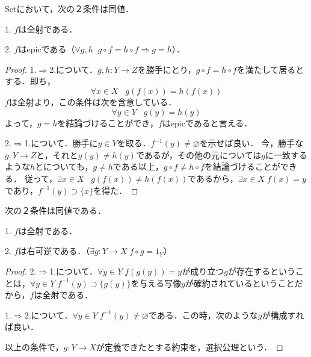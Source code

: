 \documentclass[uplatex, dvipdfmx]{jsarticle}
\begin{document}
\begin{proposition*}
    Setにおいて，次の２条件は同値．
    \begin{center}
    \end{center}

    1. $f$は全射である．

    2. $f$はepicである（$\forall g,h\;\; g\circ f=h\circ f \Rightarrow g=h$）．
\end{proposition*}
\begin{proof}
    1.$\Rightarrow$2.について．$g,h:Y\to Z$を勝手にとり，$g\circ f=h\circ f$を満たして居るとする．即ち，
    \[ \forall x\in X\;\;\; g(f(x))=h(f(x)) \]
    $f$は全射より，この条件は次を含意している．
    \[ \forall y\in Y \;\;\; g(y)=h(y) \]
    よって，$g=h$を結論づけることができ，$f$はepicであると言える．

    2.$\Rightarrow$1.について．勝手に$y\in Y$を取る．$f^{-1}(y)\ne\varnothing$を示せば良い．
    今，勝手な$g:Y\to Z$と，それと$g(y)\ne h(y)$であるが，その他の元については$g$に一致するような$h$とについても，$g\ne h$である以上，$g\circ f\ne h\circ f$を結論づけることができる．
    従って，$\exists x\in X\;\;\;g(f(x))\ne h(f(x))$であるから，$\exists x\in X\; f(x)=y$であり，$f^{-1}(y)\supset \{x\}$を得た．
\end{proof}
\begin{proposition*}
    次の２条件は同値である．

    1. $f$は全射である．

    2. $f$は右可逆である．（$\exists g:Y\to X\; f\circ g=1_Y$）
\end{proposition*}
\begin{proof}
    2.$\Rightarrow$1.について．$\forall y\in Y\; f(g(y))=y$が成り立つ$g$が存在するということは，$\forall y\in Y\; f^{-1}(y)\supset \{g(y)\}$を与える写像$g$が確約されているということだから，$f$は全射である．

    1.$\Rightarrow$2.について．$\forall y\in Y\; f^{-1}(y)\ne\varnothing$である．この時，次のような$g$が構成すれば良い．
    \begin{center}
    \end{center}
    以上の条件で，$g:Y\to X$が定義できたとする約束を，選択公理という．
\end{proof}
\end{document}
